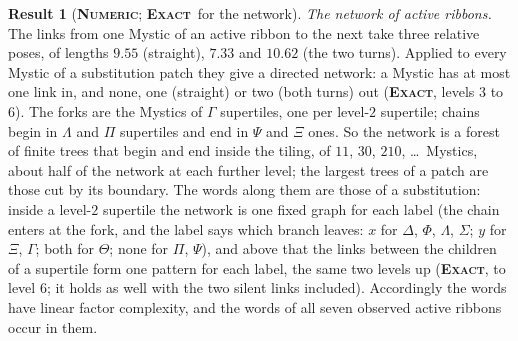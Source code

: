 \documentclass[11pt]{article}
\newcommand{\exact}{\textbf{\textsc{Exact}}}
\newcommand{\numeric}{\textbf{\textsc{Numeric}}}
\theoremstyle{definition}
\newtheorem{result}{Result}
\begin{document}
\begin{result}[\numeric; \exact\ for the network]
\emph{The network of active ribbons.} The links from one Mystic of an active ribbon to the next take three relative poses, of lengths $9.55$ (straight), $7.33$ and $10.62$ (the two turns). Applied to every Mystic of a substitution patch they give a directed network: a Mystic has at most one link in, and none, one (straight) or two (both turns) out (\exact, levels $3$ to $6$). The forks are the Mystics of $\Gamma$ supertiles, one per level-$2$ supertile; chains begin in $\Lambda$ and $\Pi$ supertiles and end in $\Psi$ and $\Xi$ ones. So the network is a forest of finite trees that begin and end inside the tiling, of $11$, $30$, $210$, \dots\ Mystics, about half of the network at each further level; the largest trees of a patch are those cut by its boundary. The words along them are those of a substitution: inside a level-$2$ supertile the network is one fixed graph for each label (the chain enters at the fork, and the label says which branch leaves: $x$ for $\Delta$, $\Phi$, $\Lambda$, $\Sigma$; $y$ for $\Xi$, $\Gamma$; both for $\Theta$; none for $\Pi$, $\Psi$), and above that the links between the children of a supertile form one pattern for each label, the same two levels up (\exact, to level $6$; it holds as well with the two silent links included). Accordingly the words have linear factor complexity, and the words of all seven observed active ribbons occur in them.


\end{result}
\end{document}
